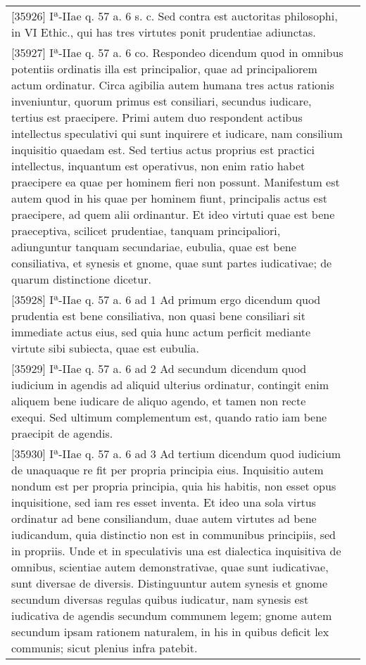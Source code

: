 \documentclass[10pt]{jsarticle} %
\begin{document}
\begin{longtable}{p{21em}p{21em}}
[35926] Iª-IIae q. 57 a. 6 s. c. Sed contra est auctoritas philosophi,
in VI Ethic., qui has tres virtutes ponit prudentiae adiunctas.

&


\\


[35927] Iª-IIae q. 57 a. 6 co. Respondeo dicendum quod in omnibus
potentiis ordinatis illa est principalior, quae ad principaliorem actum
ordinatur. Circa agibilia autem humana tres actus rationis inveniuntur,
quorum primus est consiliari, secundus iudicare, tertius est
praecipere. Primi autem duo respondent actibus intellectus speculativi
qui sunt inquirere et iudicare, nam consilium inquisitio quaedam
est. Sed tertius actus proprius est practici intellectus, inquantum est
operativus, non enim ratio habet praecipere ea quae per hominem fieri
non possunt. Manifestum est autem quod in his quae per hominem fiunt,
principalis actus est praecipere, ad quem alii ordinantur. Et ideo
virtuti quae est bene praeceptiva, scilicet prudentiae, tanquam
principaliori, adiunguntur tanquam secundariae, eubulia, quae est bene
consiliativa, et synesis et gnome, quae sunt partes iudicativae; de
quarum distinctione dicetur.


&


\\


[35928] Iª-IIae q. 57 a. 6 ad 1 Ad primum ergo dicendum quod prudentia
est bene consiliativa, non quasi bene consiliari sit immediate actus
eius, sed quia hunc actum perficit mediante virtute sibi subiecta, quae
est eubulia.


&


\\


[35929] Iª-IIae q. 57 a. 6 ad 2 Ad secundum dicendum quod iudicium in
agendis ad aliquid ulterius ordinatur, contingit enim aliquem bene
iudicare de aliquo agendo, et tamen non recte exequi. Sed ultimum
complementum est, quando ratio iam bene praecipit de agendis.


&


\\


[35930] Iª-IIae q. 57 a. 6 ad 3 Ad tertium dicendum quod iudicium de
unaquaque re fit per propria principia eius. Inquisitio autem nondum est
per propria principia, quia his habitis, non esset opus inquisitione,
sed iam res esset inventa. Et ideo una sola virtus ordinatur ad bene
consiliandum, duae autem virtutes ad bene iudicandum, quia distinctio
non est in communibus principiis, sed in propriis. Unde et in
speculativis una est dialectica inquisitiva de omnibus, scientiae autem
demonstrativae, quae sunt iudicativae, sunt diversae de
diversis. Distinguuntur autem synesis et gnome secundum diversas regulas
quibus iudicatur, nam synesis est iudicativa de agendis secundum
communem legem; gnome autem secundum ipsam rationem naturalem, in his in
quibus deficit lex communis; sicut plenius infra patebit.



\end{longtable}
\end{document}
